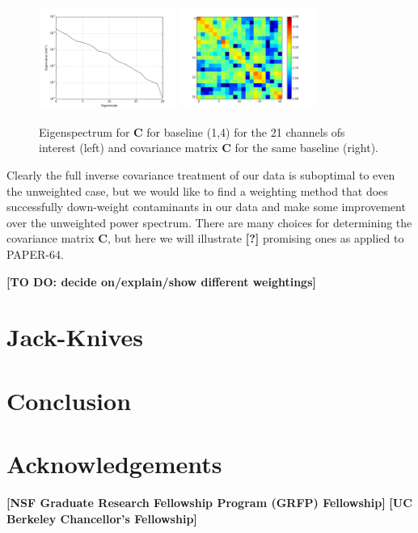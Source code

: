 \documentclass[preprint2,numberedappendix,tighten,twocolappendix]{aastex6}  %
\newcommand{\cc}[1]{{\color{purple} \textbf{[#1]}}}
\begin{document}
\begin{figure}
	\centering
	\includegraphics[width=0.4\textwidth]{eigenspectrum.png}
	\includegraphics[width=0.4\textwidth]{covariance.png}
	\caption{Eigenspectrum for $\textbf{C}$ for baseline (1,4) for the 21 channels ofs interest (left) and covariance matrix $\textbf{C}$ for the same baseline (right).}
	\label{fig:eigenspectrum}
\end{figure}

Clearly the full inverse covariance treatment of our data is suboptimal to even the unweighted case, but we would like to find a weighting method that does successfully down-weight contaminants in our data and make some improvement over the unweighted power spectrum. There are many choices for determining the covariance matrix $\textbf{C}$, but here we will illustrate \cc{?} promising ones as applied to PAPER-64.

\cc{TO DO: decide on/explain/show different weightings}

\section{Jack-Knives}
\label{sec:Jack}

\section{Conclusion}
\label{sec:Con}

\section{Acknowledgements}
\cc{NSF Graduate Research Fellowship Program (GRFP) Fellowship}
\cc{UC Berkeley Chancellor's Fellowship}
\label{sec:Ack}



\end{document}
